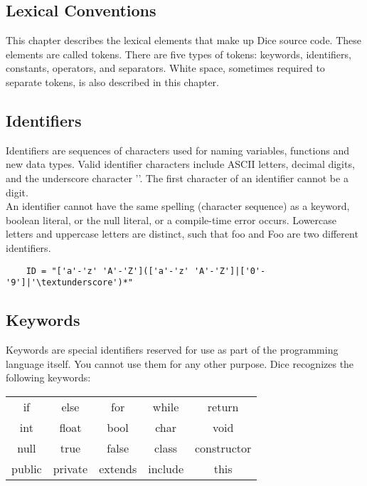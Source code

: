 \begin{homeworkProblem}
	\chapter{Lexical Conventions}
	This chapter describes the lexical elements that make up Dice source code. These elements are called tokens. There are five types of tokens: keywords, identifiers, constants, operators, and separators. White space, sometimes required to separate tokens, is also described in this chapter.
	
	\section{Identifiers}
	Identifiers are sequences of characters used for naming variables, functions and new data types. Valid identifier characters include ASCII letters, decimal digits, and the underscore character '\textunderscore'. The first character of an identifier cannot be a digit.\\
	An identifier cannot have the same spelling (character sequence) as a keyword, boolean literal, or the null literal, or a compile-time error occurs. Lowercase letters and uppercase letters are distinct, such that foo and Foo are two different identifiers.
	
	\begin{verbatim}
	ID = "['a'-'z' 'A'-'Z'](['a'-'z' 'A'-'Z']|['0'-'9']|'\textunderscore')*"
	\end{verbatim}
	
	\section{Keywords}
	Keywords are special identifiers reserved for use as part of the programming language itself. You cannot use them for any other purpose. Dice recognizes the following keywords:
	
	\begin{center}
		\begin{tabular}{ccccc}
		if & else & for & while & return \\
		int & float & bool & char & void \\
		null & true & false & class & constructor \\
		public & private & extends & include & this \\
		\end{tabular}
	\end{center}


\end{homeworkProblem}
